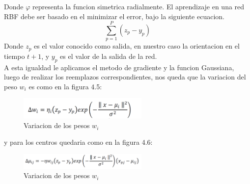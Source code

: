 Donde $\varphi$ representa la funcion simetrica radialmente.
El aprendizaje en una red RBF debe ser basado en el minimizar el error, bajo la siguiente ecuacion.
\[
\sum_{p=1}^{P}(z_p-y_p)
\]
Donde $z_p$ es el valor conocido como salida, en nuestro caso la orientacion en el tiempo $t+1$, y $y_p$ es el valor de la salida de la red.\\
A esta igualdad le aplicamos el metodo de gradiente y la funcion Gaussiana,  luego de realizar los reemplazos correspondientes, nos queda que la variacion  del peso $w_i$ es como en la figura 4.5:\\
\begin{figure}
\centering
\includegraphics[width=2.5in]{eq1.pdf}
\caption{Variacion de los pesos $w_i$ }
\label{fig_cir}
\end{figure}
y para los centros quedaria como en la figura 4.6:\\
\begin{figure}
\centering
\includegraphics[width=2.5in]{eq2.pdf}
\caption{Variacion de los pesos $w_i$ }
\label{fig_cir}
\end{figure}

%

